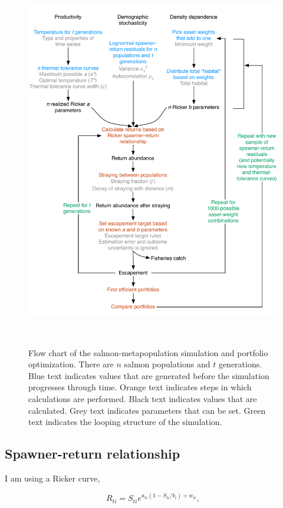 \documentclass[12pt]{article}
\begin{document}
\begin{figure}[htbp]
  \centering
    \includegraphics[height=6.5in]{simulation_diagram.pdf}
 \caption{Flow chart of the salmon-metapopulation simulation and portfolio optimization. There are $n$ salmon populations and $t$ generations. Blue text indicates values that are generated before the simulation progresses through time. Orange text indicates steps in which calculations are performed. Black text indicates values that are calculated. Grey text indicates parameters that can be set. Green text indicates the looping structure of the simulation.}
  \label{fig:sim-diagram}
\end{figure}

\subsection{Spawner-return relationship}

I am using a Ricker curve,

\begin{equation}
R_{ti} = S_{ti}e^{a_{ti}(1-S_{ti}/b_i) + w_{ti}},
\end{equation}
\end{document}
